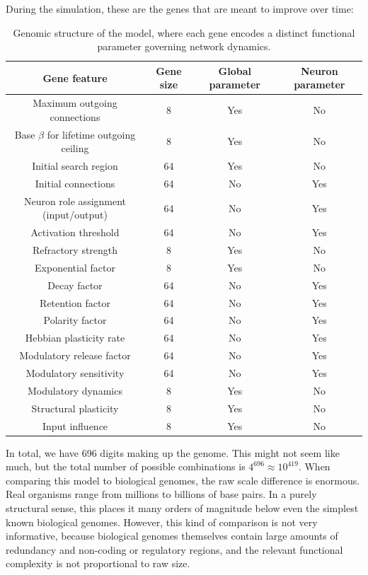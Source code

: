 \documentclass[12pt,a4paper]{article}
\begin{document}
	During the simulation, these are the genes that are meant to improve over time:
	\begin{table}[h]
	\centering
	\begin{tabular}{|c|c|c|c|}
		\hline
		\textbf{Gene feature} & \textbf{Gene size} & \textbf{Global parameter} & \textbf{Neuron parameter}\\
		\hline
		Maximum outgoing connections & 8 & Yes & No\\
		\hline
		Base $\beta$ for lifetime outgoing ceiling & 8 & Yes & No\\
		\hline
		Initial search region & 64 & Yes & No\\
		\hline
		Initial connections & 64 & No & Yes\\
		\hline
		Neuron role assignment (input/output) & 64 & No & Yes\\
		\hline
		Activation threshold & 64 & No & Yes\\
		\hline
		Refractory strength & 8 & Yes & No\\
		\hline
		Exponential factor & 8 & Yes & No\\
		\hline
		Decay factor & 64 & No & Yes\\
		\hline
		Retention factor & 64 & No & Yes\\
		\hline
		Polarity factor & 64 & No & Yes\\
		\hline
		Hebbian plasticity rate & 64 & No & Yes\\
		\hline
		Modulatory release factor & 64 & No & Yes\\
		\hline
		Modulatory sensitivity & 64 & No & Yes\\
		\hline
		Modulatory dynamics & 8 & Yes & No\\
		\hline
		Structural plasticity & 8 & Yes & No\\
		\hline
		Input influence & 8 & Yes & No\\
		\hline
	\end{tabular}
	\caption{\footnotesize{Genomic structure of the model, where each gene encodes a distinct functional parameter governing network dynamics.}}
	\label{model_gens}
	\end{table}
	
	In total, we have 696 digits making up the genome. This might not seem like much, but the total number of possible combinations is $4^{696} \approx 10^{419}$. When comparing this model to biological genomes, the raw scale difference is enormous. Real organisms range from millions to billions of base pairs. In a purely structural sense, this places it many orders of magnitude below even the simplest known biological genomes. However, this kind of comparison is not very informative, because biological genomes themselves contain large amounts of redundancy and non-coding or regulatory regions, and the relevant functional complexity is not proportional to raw size.
\end{document}
